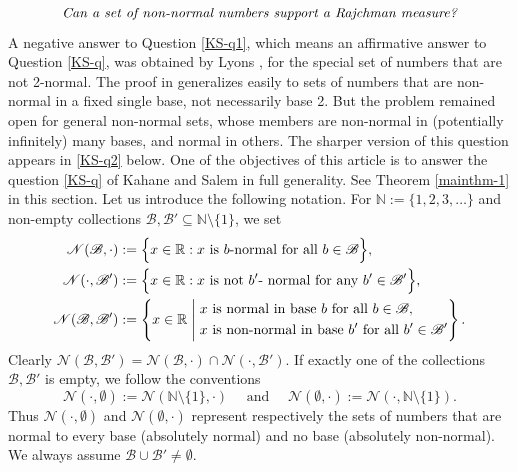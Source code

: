 \documentclass[12pt, twoside]{article}
\theoremstyle{definition}
\numberwithin{equation}{section}
\begin{document}
\begin{equation} \label{KS-q} 
{\text{\em{Can a set of non-normal numbers support a Rajchman measure?}}}
\end{equation} 
A negative answer to Question \eqref{KS-q1}, which means an affirmative answer to Question \eqref{KS-q}, was obtained by Lyons \cite{l86}, for the special set of numbers that are not 2-normal. The proof in \cite{l86} generalizes easily to sets of numbers that are non-normal in a fixed single base, not necessarily base 2. But the problem remained open for general non-normal sets, whose members are non-normal in (potentially infinitely) many bases, and normal in others. The sharper version of this question appears in \eqref{KS-q2} below. One of the objectives of this article is to answer the question \eqref{KS-q} of Kahane and Salem in full generality.  See Theorem \ref{mainthm-1} in this section. 
\vskip0.1in
\noindent Let us introduce the following notation. For $\mathbb N := \{1, 2, 3, \ldots \}$ and non-empty collections $\mathscr{B}, \mathscr{B}' \subseteq \mathbb N \setminus \{1\}$, we set
\begin{align}  
\mathscr N(\mathscr B, \cdot) &:=  \Bigl\{x \in \mathbb R: x \text{ is $b$-normal for all } b \in \mathscr B \Bigr\}, \label{NB} \\  
\mathscr N(\cdot, \mathscr B') &:=  \Bigl\{x \in \mathbb R: x \text{ is not $b'$- normal for any } b' \in \mathscr B' \Bigr\}, \label{NB'}  \\
\mathscr N(\mathscr B, \mathscr B') &:= \left\{x \in \mathbb R \; \Biggl| \;  \begin{aligned} &x \text{ is normal in base } b \text{ for all } b \in \mathscr B, \\  &x \text{ is non-normal in base } b' \text{ for all } b' \in \mathscr B' \end{aligned}  \right\}. \label{NBB'} 
\end{align}  
Clearly $\mathscr N(\mathscr B, \mathscr B') = \mathscr N(\mathscr B, \cdot) \cap \mathscr N(\cdot, \mathscr B')$. If exactly one of the collections $\mathscr{B}, \mathscr{B}'$ is empty, we follow the conventions
\[ \mathscr N(\cdot, \emptyset) := \mathscr N(\mathbb N \setminus \{1\}, \cdot) \quad \text{ and } \quad \mathscr N(\emptyset, \cdot) := \mathscr N(\cdot, \mathbb N \setminus \{1\}). \] 
Thus $\mathscr N(\cdot, \emptyset)$ and $\mathscr N(\emptyset, \cdot)$ represent respectively the sets of numbers that are normal to every base (absolutely normal) and no base (absolutely non-normal). We always assume $\mathscr{B} \cup \mathscr{B}' \ne \emptyset$.
\end{document}
